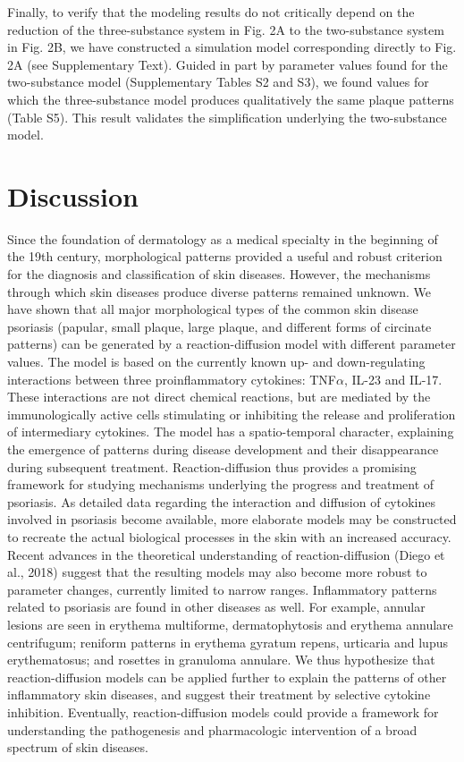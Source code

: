 Finally, to verify that the modeling results do not critically depend on the reduction of the three-substance system in Fig. 2A to the two-substance system in Fig. 2B, we have constructed a simulation model corresponding directly to Fig. 2A (see Supplementary Text). Guided in part by parameter values found for the two-substance model (Supplementary Tables S2 and S3), we found values for which the three-substance model produces qualitatively the same plaque patterns (Table S5). This result validates the simplification underlying the two-substance model.

\section{Discussion}
Since the foundation of dermatology as a medical specialty in the beginning of the 19th century, morphological patterns provided a useful and robust criterion for the diagnosis and classification of skin diseases. However, the mechanisms through which skin diseases produce diverse patterns remained unknown. We have shown that all major morphological types of the common skin disease psoriasis (papular, small plaque, large plaque, and different forms of circinate patterns) can be generated by a reaction-diffusion model with different parameter values. The model is based on the currently known up- and down-regulating interactions between three proinflammatory cytokines: TNF$\alpha$, IL-23 and IL-17. These interactions are not direct chemical reactions, but are mediated by the immunologically active cells stimulating or inhibiting the release and proliferation of intermediary cytokines. The model has a spatio-temporal character, explaining the emergence of patterns during disease development and their disappearance during subsequent treatment. Reaction-diffusion thus provides a promising framework for studying mechanisms underlying the progress and treatment of psoriasis. As detailed data regarding the interaction and diffusion of cytokines involved in psoriasis become available, more elaborate models may be constructed to recreate the actual biological processes in the skin with an increased accuracy. Recent advances in the theoretical understanding of reaction-diffusion (Diego et al., 2018) suggest that the resulting models may also become more robust to parameter changes, currently limited to narrow ranges.  
Inflammatory patterns related to psoriasis are found in other diseases as well. For example, annular lesions are seen in erythema multiforme, dermatophytosis and erythema annulare centrifugum; reniform patterns in erythema gyratum repens, urticaria and lupus erythematosus; and rosettes in granuloma annulare. We thus hypothesize that reaction-diffusion models can be applied further to explain the patterns of other inflammatory skin diseases, and suggest their treatment by selective cytokine inhibition. Eventually, reaction-diffusion models could provide a framework for understanding the pathogenesis and pharmacologic intervention of a broad spectrum of skin diseases. 

